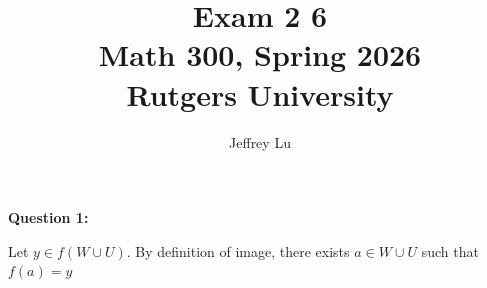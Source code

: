 \documentclass[12pt]{article}
\title{Exam 2 6\\ \large Math 300, Spring 2026 \\ Rutgers University}
\author{Jeffrey Lu}
\begin{document}
\maketitle

\noindent{}\textbf{Question 1:}

Let $y \in f(W \cup U)$. By definition of image, there exists $a \in W \cup U$ such that
$f(a) = y$
\end{document}
